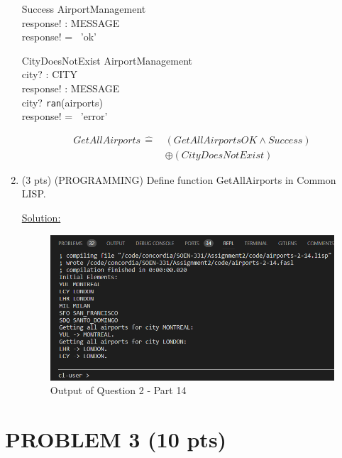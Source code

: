 \documentclass[12pt]{article}
\begin{document}
\begin{spacing}{1.5}
\begin{enumerate}
		      \begin{schema}{Success}
		      	\Xi AirportManagement \\
		      	response! : MESSAGE \\
		      	\where
		      	response! = \, 'ok' \\
		      \end{schema}
		      
		      \begin{schema}{CityDoesNotExist}
		      	\Xi AirportManagement \\
		      	city? : CITY \\
		      	response! : MESSAGE \\
		      	\where
		      	city? \notin \texttt{ran}(airports) \\
		      	response! = \, 'error' \\
		      \end{schema}
		      \begin{align*}
		      	GetAllAirports \, \hat{=} \, & (GetAllAirportsOK \land Success) \\
		      	                             & \oplus (CityDoesNotExist)        
		      \end{align*}
		      \newpage
		\item (3 pts) (PROGRAMMING) Define function GetAllAirports in Common LISP.
		              
		      \underline{Solution:}
		      
		      
		      \begin{figure}[htp]
		      	\centering
		      	\includegraphics[width=1\textwidth]{static/airports-2-14.PNG}
		      	\caption{Output of Question 2 - Part 14}
		      \end{figure}
	\end{enumerate}
	\newpage
	\section*{PROBLEM 3 (10 pts)}
	

\end{spacing}
\end{document}
